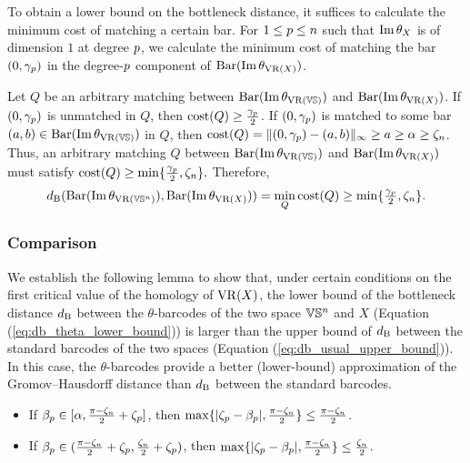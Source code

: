 To obtain a lower bound on the bottleneck distance, it suffices to calculate the minimum cost of matching a certain bar. 
For $1 \leq p \leq n$ such that $\operatorname{Im} \theta_X$ is of dimension $1$ at degree $p$, we calculate the minimum cost of matching the bar $(0,\gamma_p )$ in the degree-$p$ component of $\operatorname{Bar}(\operatorname{Im} \theta_{\operatorname{VR}(X)})$.


Let $Q$ be an arbitrary matching between $\operatorname{Bar}(\operatorname{Im} \theta_{\operatorname{VR}(\mathbb{V}\mathbb{S})})$ and $\operatorname{Bar}(\operatorname{Im} \theta_{\operatorname{VR}(X)})$.
If $(0,\gamma_p )$ is unmatched in $Q$, then $\mathrm{cost}(Q) \geq \tfrac{\gamma_p }{2}$. 
If $(0,\gamma_p )$ is matched to some bar $(a,b) \in \operatorname{Bar}(\operatorname{Im} \theta_{\operatorname{VR}(\mathbb{V}\mathbb{S})})$ in $Q$, then 
$\mathrm{cost}(Q) =  \|(0,\gamma_p ) - (a,b)\|_\infty \geq  a \geq \alpha \geq \zeta_n$.
Thus, an arbitrary matching $Q$ between $\operatorname{Bar}(\operatorname{Im} \theta_{\operatorname{VR}(\mathbb{V}\mathbb{S})})$ and $\operatorname{Bar}(\operatorname{Im} \theta_{\operatorname{VR}(X)})$ must satisfy $\mathrm{cost}(Q) 
    \geq \min\{\tfrac{\gamma_p }{2}, \zeta_n\}.$
Therefore, 
\begin{equation}\label{eq:db_theta_lower_bound}
    \db(\thetabarc{\VS^n}, \thetabarc{X})
    = \min_Q \cost(Q) 
    \geq \min\{\tfrac{\gamma_\degp }{2}, \zeta_n\}. %
\end{equation}

\subsubsection{Comparison}
\label{subsub:comparison}

We establish the following lemma to show that, under certain conditions on the first critical value of the homology of  $\operatorname{VR}(X)$, the lower bound of the bottleneck distance $d_{\mathrm{B}}$ between the $\theta$-barcodes of the two space $\mathbb{V}\mathbb{S}^n$ and $X$ (Equation (\ref{eq:db_theta_lower_bound}))  is larger than the upper bound of $d_{\mathrm{B}}$ between the standard barcodes of the two spaces (Equation (\ref{eq:db_usual_upper_bound})). 
In this case, the $\theta$-barcodes provide a better (lower-bound) approximation of the Gromov--Hausdorff distance than $d_{\mathrm{B}}$ between the standard barcodes.

\lemma 
\begin{itemize}
    \item If $\beta_p \in [\alpha, \tfrac{\pi - \zeta_n}{2}+\zeta_p]$, then
            $\max\{|\zeta_p  - \beta_p |, \tfrac{\pi - \zeta_n}{2}\}
            \leq \tfrac{\pi - \zeta_n}{2}$.
    \item If $\beta_p \in (\tfrac{\pi - \zeta_n}{2}+\zeta_p, \tfrac{\zeta_n}{2}+\zeta_p)$, then
            $\max\{|\zeta_p  - \beta_p |, \tfrac{\pi - \zeta_n}{2}\}
            \leq \tfrac{\zeta_n}{2}$.
\end{itemize}

